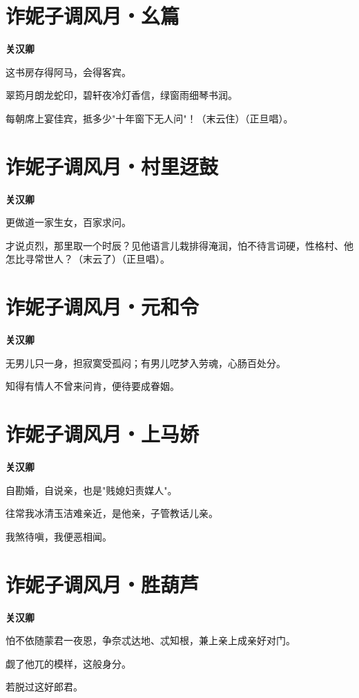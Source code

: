 \documentclass[12pt,a4paper]{ctexbook}
\begin{document}
\section{诈妮子调风月・幺篇}
\textbf{关汉卿}\par\vspace{0.5em}
这书房存得阿马，会得客宾。\par
翠筠月朗龙蛇印，碧轩夜冷灯香信，绿窗雨细琴书润。\par
每朝席上宴佳宾，抵多少"十年窗下无人问"！（末云住）（正旦唱）。\par

\section{诈妮子调风月・村里迓鼓}
\textbf{关汉卿}\par\vspace{0.5em}
更做道一家生女，百家求问。\par
才说贞烈，那里取一个时辰？见他语言儿栽排得淹润，怕不待言词硬，性格村、他怎比寻常世人？（末云了）（正旦唱）。\par

\section{诈妮子调风月・元和令}
\textbf{关汉卿}\par\vspace{0.5em}
无男儿只一身，担寂寞受孤闷；有男儿呓梦入劳魂，心肠百处分。\par
知得有情人不曾来问肯，便待要成眷姻。\par

\section{诈妮子调风月・上马娇}
\textbf{关汉卿}\par\vspace{0.5em}
自勘婚，自说亲，也是"贱媳妇责媒人"。\par
往常我冰清玉洁难亲近，是他亲，子管教话儿亲。\par
我煞待嗔，我便恶相闻。\par

\section{诈妮子调风月・胜葫芦}
\textbf{关汉卿}\par\vspace{0.5em}
怕不依随蒙君一夜恩，争奈忒达地、忒知根，兼上亲上成亲好对门。\par
觑了他兀的模样，这般身分。\par
若脱过这好郎君。\par
\end{document}
